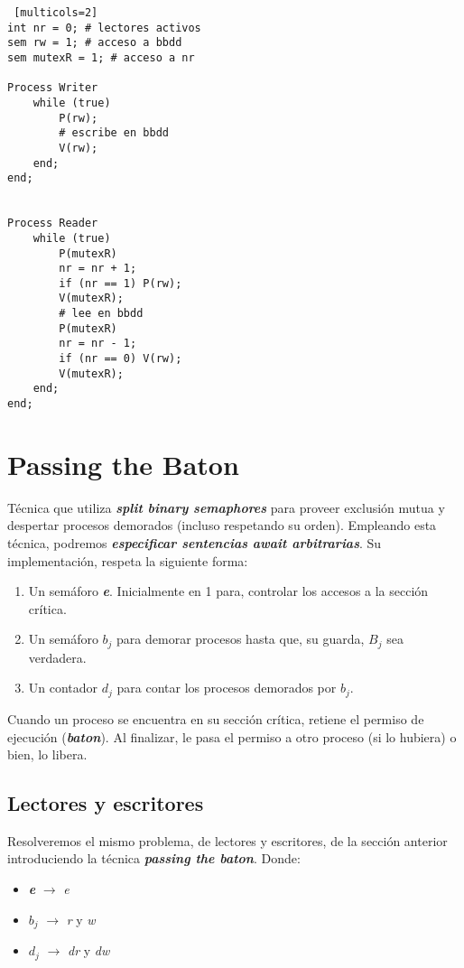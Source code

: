 \documentclass[a4paper, 10pt, margin=0in]{report}
\begin{document}
\begin{lstlisting} [multicols=2]
int nr = 0; # lectores activos
sem rw = 1; # acceso a bbdd
sem mutexR = 1; # acceso a nr

Process Writer
    while (true)
        P(rw);
        # escribe en bbdd
        V(rw);
    end;
end;


Process Reader
    while (true)
        P(mutexR)
        nr = nr + 1;
        if (nr == 1) P(rw);
        V(mutexR);
        # lee en bbdd
        P(mutexR)
        nr = nr - 1;
        if (nr == 0) V(rw);
        V(mutexR);
    end;
end;
\end{lstlisting}

\section{Passing the Baton}

Técnica que utiliza \textbf{\emph{split binary semaphores}} para proveer exclusión mutua y despertar procesos demorados (incluso respetando su orden). Empleando esta técnica, podremos \textbf{\emph{especificar sentencias await arbitrarias}}. Su implementación, respeta la siguiente forma:

\begin{enumerate}
    \item Un semáforo \textbf{\emph{e}}. Inicialmente en 1 para, controlar los accesos a la sección crítica.
    \item Un semáforo \textbf{\emph{$b_j$}} para demorar procesos hasta que, su guarda, \textbf{\emph{$B_j$}} sea verdadera.
    \item Un contador \textbf{\emph{$d_j$}} para contar los procesos demorados por \textbf{\emph{$b_j$}}.
\end{enumerate}

Cuando un proceso se encuentra en su sección crítica, retiene el permiso de ejecución (\textbf{\emph{baton}}). Al finalizar, le pasa el permiso a otro proceso (si lo hubiera) o bien, lo libera.

\subsection{Lectores y escritores}

Resolveremos el mismo problema, de lectores y escritores, de la sección anterior introduciendo la técnica \textbf{\emph{passing the baton}}. Donde:

\begin{itemize}
    \item \textbf{\emph{e}} $\rightarrow$ \emph{e}
    \item \textbf{\emph{$b_j$}} $\rightarrow$ \emph{r} y \emph{w}
    \item \textbf{\emph{$d_j$}} $\rightarrow$ \emph{dr} y \emph{dw}
\end{itemize}
\end{document}
